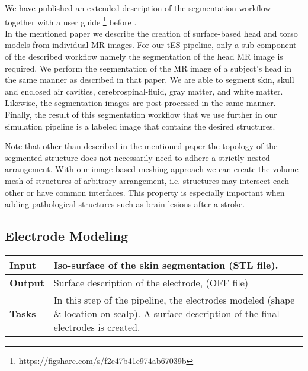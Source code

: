 We have published an extended description of the segmentation workflow together with a user guide
\footnote{https://figshare.com/s/f2e47b41e974ab67039b} before \cite{kalloch2018semi}.\\
In the mentioned paper we describe the creation of surface-based head and torso models from individual 
MR images. For our tES pipeline, only a sub-component of the described workflow namely the segmentation
of the head MR image is required. We perform the segmentation of the MR image of a
subject's head  in the same manner as described in that paper. We are able to segment skin, skull
and enclosed air cavities, cerebrospinal-fluid, gray matter, and white matter. Likewise, the segmentation
images are post-processed in the same manner. Finally, the result of this segmentation workflow that
we use further in our simulation pipeline is a labeled image that contains the desired structures.\par
Note that other than described in the mentioned paper the topology of the segmented structure does not 
necessarily need to adhere a strictly nested arrangement. With our image-based meshing approach we
can create the volume mesh of structures of arbitrary arrangement, i.e. structures may intersect each
other or have common interfaces. This property is especially important when adding pathological
structures such as brain lesions after a stroke.


\subsection{Electrode Modeling}\label{sec:electrodemodeling}
\begin{tabular}{ | p{} || p{} | }
    \hline
    \textbf{Input}  & Iso-surface of the skin segmentation (STL file).\\
    \hline
    \textbf{Output} & Surface description of the electrode, (OFF file) \\ 
    \hline
    \textbf{Tasks} & In this step of the pipeline, the electrodes modeled (shape \& location on scalp).
                     A surface description of the final electrodes is created.\\
    \hline
\end{tabular}

\hspace{0.5cm}

